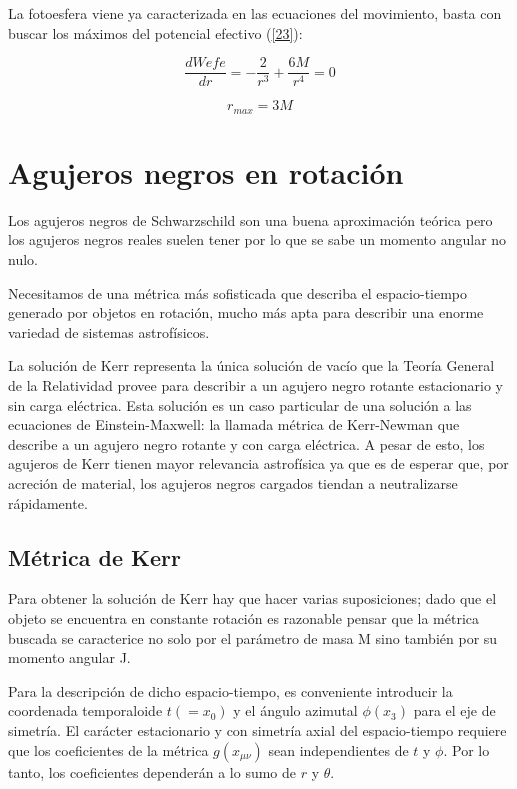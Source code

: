 \documentclass{article}
\begin{document}
La fotoesfera viene ya caracterizada en las ecuaciones del movimiento, basta con buscar los máximos del potencial efectivo (\ref{23})\cite{zamorageodesicas}:

\begin{equation}
    \frac{dWefe}{dr}=-\frac{2}{r^{3}}+\frac{6M}{r^{4}}=0
\end{equation}

\begin{equation}
    r_{max}=3M
\end{equation}

\section{Agujeros negros en rotación}

Los agujeros negros de Schwarzschild son una buena aproximación teórica pero los agujeros negros reales suelen tener por lo que se sabe un momento angular no nulo.

Necesitamos de una métrica más sofisticada que describa el espacio-tiempo generado por objetos en rotación, mucho más apta para describir una enorme variedad de sistemas astrofísicos.\cite{jeffersonagujeros}\cite{kerr1963gravitational}

La solución de Kerr representa la única solución de vacío que la Teoría General de la Relatividad provee para describir a un agujero negro rotante estacionario y sin carga eléctrica. Esta solución es un caso particular de una solución a las ecuaciones de Einstein-Maxwell: la llamada métrica de Kerr-Newman que describe a un agujero negro rotante y con carga eléctrica. A pesar de esto, los agujeros de Kerr tienen mayor relevancia astrofísica ya que es de esperar que, por acreción de material, los agujeros negros cargados tiendan a neutralizarse rápidamente.\cite{sandoval2009perturbaciones}

\subsection{Métrica de Kerr}

Para obtener la solución de Kerr hay que hacer varias suposiciones; dado que el objeto se encuentra en constante rotación es razonable pensar que la
métrica buscada se caracterice no solo por el parámetro de masa M sino también por su momento angular J.\cite{jeffersonagujeros}

Para la descripción de dicho espacio-tiempo, es conveniente introducir la
coordenada temporaloide $t(= x_{0})$ y el ángulo azimutal $\phi( x_{3})$ para el eje de simetría. El carácter estacionario y con simetría axial del espacio-tiempo requiere que los coeficientes de la métrica $g( x_{\mu\nu})$ sean independientes de $t$ y $\phi$. Por lo tanto, los coeficientes dependerán a lo sumo de $r$ y $\theta$.\cite{jeffersonagujeros}
\end{document}
